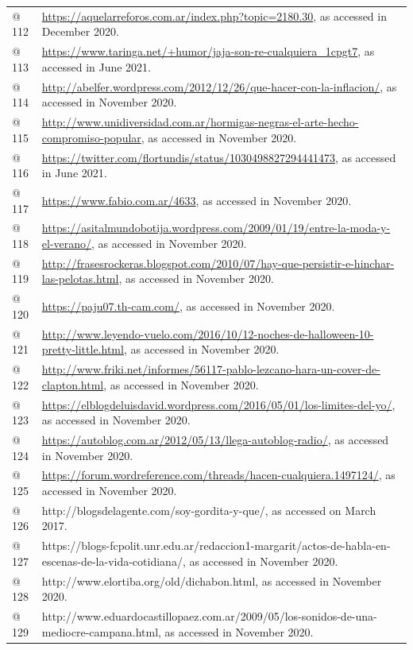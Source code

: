\begin{flushleft}
\begin{supertabular}{m{0.7955598in}m{5.35876in}}
@ 112  &
\url{https://aquelarreforos.com.ar/index.php?topic=2180.30}, as accessed in December 2020.\\
@ 113  &
\url{https://www.taringa.net/+humor/jaja-son-re-cualquiera_1cpgt7}, as accessed in June 2021.\\
@ 114  &
\url{http://abelfer.wordpress.com/2012/12/26/que-hacer-con-la-inflacion/}, as accessed in November 2020.\\
@ 115  &
\url{http://www.unidiversidad.com.ar/hormigas-negras-el-arte-hecho-compromiso-popular}, as accessed in November 2020.\\
@ 116  &
\url{https://twitter.com/flortundis/status/1030498827294441473}, as accessed in June 2021.\\
@ 117  &
\url{https://www.fabio.com.ar/4633}, as accessed in November 2020.\\
@ 118  &
\url{https://asitalmundobotija.wordpress.com/2009/01/19/entre-la-moda-y-el-verano/}, as accessed in November 2020.\\
@ 119  &
\url{http://frasesrockeras.blogspot.com/2010/07/hay-que-persistir-e-hinchar-las-pelotas.html}, as accessed in November 2020.\\
@ 120  &
\url{https://paju07.th-cam.com/}, as accessed in November 2020.\\
@ 121  &
\url{http://www.leyendo-vuelo.com/2016/10/12-noches-de-halloween-10-pretty-little.html}, as accessed in November 2020.\\
@ 122  &
\url{http://www.friki.net/informes/56117-pablo-lezcano-hara-un-cover-de-clapton.html}, as accessed in November 2020.\\
@ 123  &
\url{https://elblogdeluisdavid.wordpress.com/2016/05/01/los-limites-del-yo/}, as accessed in November 2020.\\
@ 124  &
\url{https://autoblog.com.ar/2012/05/13/llega-autoblog-radio/}, as accessed in November 2020.\\
@ 125  &
\url{https://forum.wordreference.com/threads/hacen-cualquiera.1497124/}, as accessed in November 2020.\\
@ 126  &
http://blogsdelagente.com/soy-gordita-y-que/, as accessed on March 2017.\\
@ 127  &
https://blogs-fcpolit.unr.edu.ar/redaccion1-margarit/actos-de-habla-en-escenas-de-la-vida-cotidiana/, as accessed in November 2020.\\
@ 128  &
http://www.elortiba.org/old/dichabon.html, as accessed in November 2020.\\
@ 129  &
http://www.eduardocastillopaez.com.ar/2009/05/los-sonidos-de-una-mediocre-campana.html, as accessed in November 2020.\\

\end{supertabular}
\end{flushleft}
